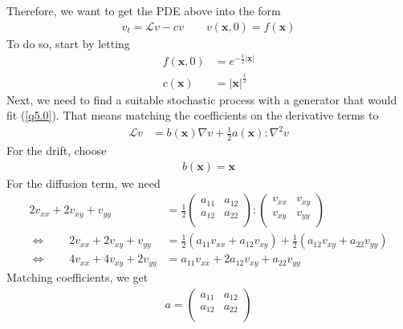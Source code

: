 \documentclass[12pt]{article}
\theoremstyle{plain}
\theoremstyle{definition}
\theoremstyle{remark}
\begin{document}
\begin{enumerate}
    Therefore, we want to get the PDE above into the form
    \begin{align}
      \label{q5.0}
      v_t = \mathscr{L}v - cv
      \qquad v(\mathbf{x},0) = f(\mathbf{x})
    \end{align}
    To do so, start by letting
    \begin{align*}
      f(\mathbf{x},0) &= e^{-\frac{1}{2}|\mathbf{x}|} \\
      c(\mathbf{x}) &= |\mathbf{x}|^{\frac{1}{2}}
    \end{align*}
    Next, we need to find a suitable stochastic process with a generator
    that would fit (\ref{q5.0}). That means matching the coefficients on
    the derivative terms to
    \begin{align*}
      \mathscr{L}v
      &=
      b(\mathbf{x}) \nabla v
      + \frac{1}{2} a(\mathbf{x}) : \nabla^2 v
    \end{align*}
    For the drift, choose
    \begin{align*}
      b(\mathbf{x}) = \mathbf{x}
    \end{align*}
    For the diffusion term, we need
    \begin{align*}
      2v_{xx} + 2v_{xy} + v_{yy}
      &=
        \frac{1}{2}
        \begin{pmatrix}
          a_{11} & a_{12} \\
          a_{12} & a_{22} \\
        \end{pmatrix}
        :
        \begin{pmatrix}
          v_{xx} & v_{xy} \\
          v_{xy} & v_{yy} \\
        \end{pmatrix}\\
      \Leftrightarrow\qquad
      2v_{xx} + 2v_{xy} + v_{yy}
      &= \frac{1}{2}
      (a_{11} v_{xx}
      + a_{12}v_{xy})
      +\frac{1}{2}
      (a_{12} v_{xy}
      + a_{22}v_{yy})\\
      \Leftrightarrow\qquad
      4v_{xx} + 4v_{xy} + 2v_{yy}
      &=
      a_{11} v_{xx}
      + 2a_{12}v_{xy}
      + a_{22}v_{yy}
    \end{align*}
    Matching coefficients, we get
    \begin{align*}
      a = \begin{pmatrix}
        a_{11} & a_{12} \\
        a_{12} & a_{22} \\
      \end{pmatrix}

\end{align*}
\end{enumerate}
\end{document}
